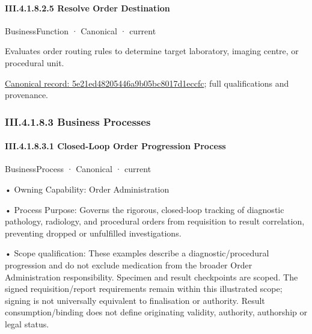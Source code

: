 \paragraph*{III.4.1.8.2.5 Resolve Order Destination}
\label{navigation:III.4.1.8.2.5}

\label{element:5e21ed48205446a9b05bc8017d1eccfc}
{\small BusinessFunction · Canonical · current}\par

Evaluates order routing rules to determine target laboratory, imaging centre, or procedural unit.


{\footnotesize \href{../../../../continuum/business/business-function/5e21ed48205446a9b05bc8017d1eccfc.md}{Canonical record: 5e21ed48205446a9b05bc8017d1eccfc}; full qualifications and provenance.}\par
\subsubsection*{III.4.1.8.3 Business Processes}
\label{navigation:III.4.1.8.3}

\paragraph*{III.4.1.8.3.1 Closed-Loop Order Progression Process}
\label{navigation:III.4.1.8.3.1}

\label{element:e19a7c9594a4401e92450e4c31598982}
{\small BusinessProcess · Canonical · current}\par

•
Owning Capability: Order Administration



•
Process Purpose: Governs the rigorous, closed-loop tracking of diagnostic pathology, radiology, and procedural orders from requisition to result correlation, preventing dropped or unfulfilled investigations.



•
Scope qualification: These examples describe a diagnostic/procedural progression and do not exclude medication from the broader Order Administration responsibility. Specimen and result checkpoints are scoped. The signed requisition/report requirements remain within this illustrated scope; signing is not universally equivalent to finalisation or authority. Result consumption/binding does not define originating validity, authority, authorship or legal status.



